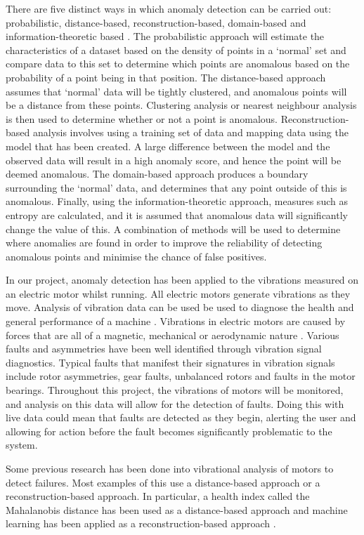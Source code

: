 There are five distinct ways in which anomaly detection can be carried out: probabilistic, distance-based, reconstruction-based, domain-based and information-theoretic based \cite{Pimentel2014215}. The probabilistic approach will estimate the characteristics of a dataset based on the density of points in a `normal' set and compare data to this set to determine which points are anomalous based on the probability of a point being in that position. The distance-based approach assumes that `normal' data will be tightly clustered, and anomalous points will be a distance from these points. Clustering analysis or nearest neighbour analysis is then used to determine whether or not a point is anomalous. Reconstruction-based analysis involves using a training set of data and mapping data using the model that has been created. A large difference between the model and the observed data will result in a high anomaly score, and hence the point will be deemed anomalous. The domain-based approach produces a boundary surrounding the `normal' data, and determines that any point outside of this is anomalous. Finally, using the information-theoretic approach, measures such as entropy are calculated, and it is assumed that anomalous data will significantly change the value of this. A combination of methods will be used to determine where anomalies are found in order to improve the reliability of detecting anomalous points and minimise the chance of false positives.

In our project, anomaly detection has been applied to the vibrations measured on an electric motor whilst running. All electric motors generate vibrations as they move. Analysis of vibration data can be used be used to diagnose the health and general performance of a machine \cite{DelgadoArredondo2017568}. Vibrations in electric motors are caused by forces that are all of a magnetic, mechanical or aerodynamic nature \cite{dorrell_smith_1996}. Various faults and asymmetries have been well identified through vibration signal diagnostics. Typical faults that manifest their signatures in vibration signals include rotor asymmetries, gear faults, unbalanced rotors and faults in the motor bearings. Throughout this project, the vibrations of motors will be monitored, and analysis on this data will allow for the detection of faults. Doing this with live data could mean that faults are detected as they begin, alerting the user and allowing for action before the fault becomes significantly problematic to the system.

Some previous research has been done into vibrational analysis of motors to detect failures. Most examples of this use a distance-based approach or a reconstruction-based approach. In particular, a health index called the Mahalanobis distance has been used as a distance-based approach \cite{Jin20135787} and machine learning has been applied as a reconstruction-based approach \cite{5899067}.

